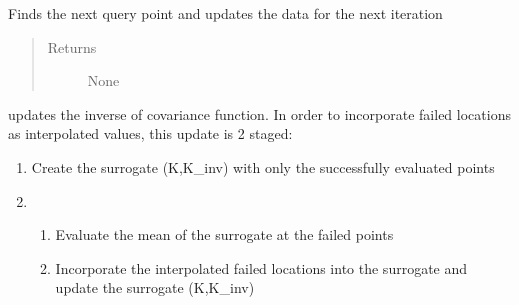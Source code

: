 \documentclass[letterpaper,12pt,english]{sphinxmanual}
\begin{document}
\begin{fulllineitems}
\begin{fulllineitems}
\begin{quote}
\begin{description}
\end{description}\end{quote}

\end{fulllineitems}


\begin{fulllineitems}
\label{\detokenize{PARyOpt:PARyOpt.paryopt.BayesOpt.update_iter}}
\sphinxAtStartPar
Finds the next query point and updates the data for the next iteration
\begin{quote}\begin{description}
\item[{Returns}] \leavevmode
\sphinxAtStartPar
None

\end{description}\end{quote}

\end{fulllineitems}


\begin{fulllineitems}
\label{\detokenize{PARyOpt:PARyOpt.paryopt.BayesOpt.update_surrogate}}
\sphinxAtStartPar
updates the inverse of covariance function.
In order to incorporate failed locations as interpolated values, this update is 2 staged:
\begin{enumerate}
%
\item {} 
\sphinxAtStartPar
Create the surrogate (K,K\_inv) with only the successfully evaluated points

\item {} \begin{enumerate}
%
\item {} 
\sphinxAtStartPar
Evaluate the mean of the surrogate at the failed points

\item {} 
\sphinxAtStartPar
Incorporate the interpolated failed locations into the surrogate and update the surrogate (K,K\_inv)


\end{enumerate}
\end{enumerate}
\end{fulllineitems}
\end{fulllineitems}
\end{document}
